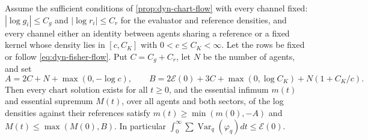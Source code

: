 Assume the sufficient conditions of \cref{prop:dyn-chart-flow} with every channel fixed: $|\log g_i|\leq C_g$ and $|\log r_i|\leq C_r$ for the evaluator and reference densities, and every channel either an identity between agents sharing a reference or a fixed kernel whose density lies in $[c,C_K]$ with $0<c\leq C_K<\infty$. Let the rows be fixed or follow \cref{eq:dyn-fisher-flow}. Put $C=C_g+C_r$, let $N$ be the number of agents, and set
\begin{equation}
 A=2C+N+\max(0,-\log c),\qquad
 B=2\mathcal E(0)+3C+\max(0,\log C_K)+N(1+C_K/c).
 \label{eq:dyn-chart-global-constants}
\end{equation}
Then every chart solution exists for all $t\geq0$, and the essential infimum $m(t)$ and essential supremum $M(t)$, over all agents and both sectors, of the log densities against their references satisfy $m(t)\geq\min(m(0),-A)$ and $M(t)\leq\max(M(0),B)$. In particular $\int_0^\infty\sum\operatorname{Var}_q(\varphi_q)dt\leq\mathcal E(0)$.
